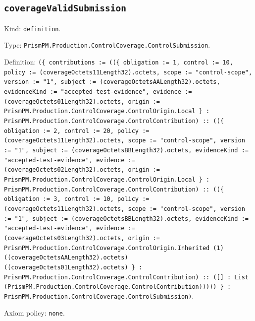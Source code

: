 \documentclass[11pt]{article}
\begin{document}
\subsection*{\texttt{coverageValidSubmission}}
\noindent Kind: \texttt{definition}.\par
\noindent Type: \texttt{PrismPM.Production.ControlCoverage.ControlSubmission}.\par
\noindent Definition: \texttt{(\{ contributions := ((\{ obligation := 1, control := 10, policy := (coverageOctets11Length32).octets, scope := "control-scope", version := "1", subject := (coverageOctetsAALength32).octets, evidenceKind := "accepted-test-evidence", evidence := (coverageOctets01Length32).octets, origin := PrismPM.Production.ControlCoverage.ControlOrigin.Local \} : PrismPM.Production.ControlCoverage.ControlContribution) :: ((\{ obligation := 2, control := 20, policy := (coverageOctets11Length32).octets, scope := "control-scope", version := "1", subject := (coverageOctetsBBLength32).octets, evidenceKind := "accepted-test-evidence", evidence := (coverageOctets02Length32).octets, origin := PrismPM.Production.ControlCoverage.ControlOrigin.Local \} : PrismPM.Production.ControlCoverage.ControlContribution) :: ((\{ obligation := 3, control := 10, policy := (coverageOctets11Length32).octets, scope := "control-scope", version := "1", subject := (coverageOctetsBBLength32).octets, evidenceKind := "accepted-test-evidence", evidence := (coverageOctets03Length32).octets, origin := PrismPM.Production.ControlCoverage.ControlOrigin.Inherited (1) ((coverageOctetsAALength32).octets) ((coverageOctets01Length32).octets) \} : PrismPM.Production.ControlCoverage.ControlContribution) :: ([] : List (PrismPM.Production.ControlCoverage.ControlContribution))))) \} : PrismPM.Production.ControlCoverage.ControlSubmission)}.\par
\noindent Axiom policy: \texttt{none}.\par
\end{document}
